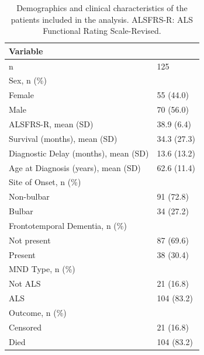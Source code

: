 \begin{table}
\centering
\caption{Demographics and clinical characteristics of the patients included in the analysis. ALSFRS-R: ALS Functional Rating Scale-Revised.}
\label{tab:coxdemographics}
\begin{tabular}{|ll|}
\hline
              \textbf{Variable}                          &      \\
\hline
 n                               & 125         \\\hline
 Sex, n (\%)          & \\
 \hspace{5mm}Female & 55 (44.0)   \\
\hspace{5mm}Male & 70 (56.0)   \\\hline
 ALSFRS-R, mean (SD)                 & 38.9 (6.4)  \\\hline
 Survival (months), mean (SD)         & 34.3 (27.3) \\\hline
 Diagnostic Delay (months), mean (SD)  & 13.6 (13.2) \\\hline
 Age at Diagnosis (years), mean (SD)  & 62.6 (11.4) \\\hline
 Site of Onset, n (\%)        &  \\
 \hspace{5mm}Non-bulbar   & 91 (72.8)   \\
 \hspace{5mm}Bulbar  & 34 (27.2)   \\\hline
 Frontotemporal Dementia, n (\%)       & \\
 \hspace{5mm}Not present & 87 (69.6)   \\
\hspace{5mm}Present & 38 (30.4)   \\\hline
 MND Type, n (\%)                & \\
 \hspace{5mm}Not ALS   & 21 (16.8)   \\
 \hspace{5mm}ALS   & 104 (83.2)  \\\hline
 Outcome, n (\%)                          & \\
 \hspace{5mm}Censored   & 21 (16.8)   \\
\hspace{5mm}Died   & 104 (83.2)  \\\hline

\end{tabular}
\end{table}

